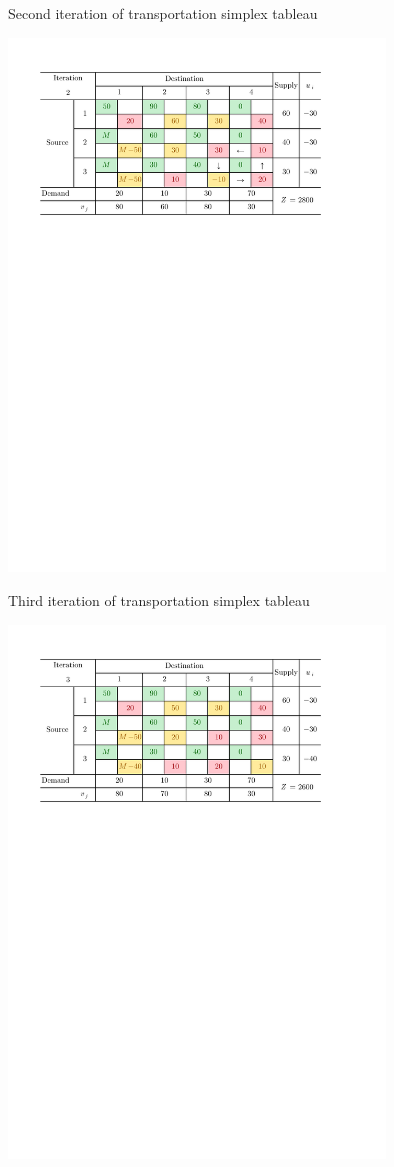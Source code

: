 \documentclass[a4paper]{article}
\begin{document}
\begin{enumerate}
\begin{enumerate}
\begin{solution}
			\begin{table}[H]
			\caption{Second iteration of transportation simplex tableau}
			\label{tabNW4}
			\centering
			\includegraphics[width = 0.75\textwidth]{NW4}				
		\end{table}

	
		\begin{table}[H]
		\caption{Third iteration of transportation simplex tableau}
		\label{tabNW5}
		\centering
		\includegraphics[width = 0.75\textwidth]{NW5}				
	\end{table}
\vspace*{-0.5cm}
		

\end{solution}
\end{enumerate}
\end{enumerate}
\end{document}
